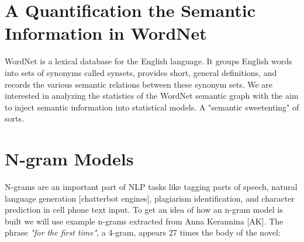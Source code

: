 \section{A Quantification the Semantic Information in WordNet}
 WordNet \cite{WORDNET} is a lexical database for the English language. It groups English words into sets of synonyms called synsets, provides short, general definitions, and records the various semantic relations between these synonym sets.  We are interested in analyzing the statistics of the WordNet semantic graph with the aim to inject semantic information into statistical models.  A "semantic sweetenting" of sorts.

\section{N-gram Models}
N-grams are an important part of NLP tasks like tagging parts of speech, natural language generation [chatterbot engines], plagiarism identification, and character prediction in cell phone text input.  To get an idea of how an  n-gram model is built we will use example n-grams extracted from Anna Kerannina [AK].  The phrase \emph{"for the first time"}, a 4-gram, appears 27 times the body of the novel:
